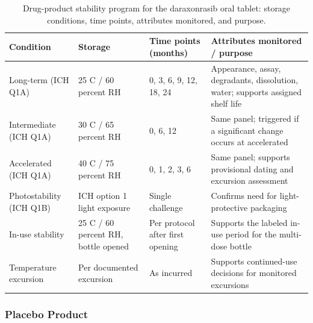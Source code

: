 \begin{table}[t]
\centering
\caption{Drug-product stability program for the daraxonrasib oral tablet:
storage conditions, time points, attributes monitored, and purpose.}
\label{tab:cmc-stability}
\begin{tabularx}{\textwidth}{L{3.5cm} L{3.3cm} L{4.2cm} Y}
\toprule
\textbf{Condition} & \textbf{Storage} & \textbf{Time points (months)} & \textbf{Attributes monitored / purpose} \\
\midrule
Long-term (ICH Q1A) & 25 C / 60 percent RH & 0, 3, 6, 9, 12, 18, 24 & Appearance, assay, degradants, dissolution, water; supports assigned shelf life \\
Intermediate (ICH Q1A) & 30 C / 65 percent RH & 0, 6, 12 & Same panel; triggered if a significant change occurs at accelerated \\
Accelerated (ICH Q1A) & 40 C / 75 percent RH & 0, 1, 2, 3, 6 & Same panel; supports provisional dating and excursion assessment \\
Photostability (ICH Q1B) & ICH option 1 light exposure & Single challenge & Confirms need for light-protective packaging \\
In-use stability & 25 C / 60 percent RH, bottle opened & Per protocol after first opening & Supports the labeled in-use period for the multi-dose bottle \\
Temperature excursion & Per documented excursion & As incurred & Supports continued-use decisions for monitored excursions \\
\bottomrule
\end{tabularx}
\end{table}

\subsubsection{Placebo Product}


